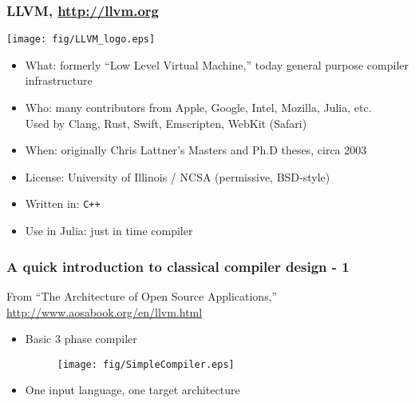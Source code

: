 \documentclass[compressed,dvips,letter]{beamer}
\begin{document}
%
%

\begin{frame}\frametitle{LLVM, \url{http://llvm.org}}
\begin{minipage}{0.35\textwidth}
\texttt{[image: fig/LLVM\_logo.eps]}
\end{minipage} \begin{minipage}{0.62\textwidth}
\begin{itemize}
\item What: formerly ``Low Level Virtual Machine,'' today general purpose compiler infrastructure
\item Who: many contributors from Apple, Google, Intel, Mozilla, Julia, etc. \\ Used by Clang, Rust, Swift, Emscripten, WebKit (Safari)
\item When: originally Chris Lattner's Masters and Ph.D theses, circa 2003
\item License: University of Illinois / NCSA (permissive, BSD-style)
\item Written in: \texttt{C++}
\item Use in Julia: just in time compiler
\end{itemize}
\end{minipage}

\end{frame}

%
%

\begin{frame}\frametitle{A quick introduction to classical compiler design - 1}
From ``The Architecture of Open Source Applications,'' \url{http://www.aosabook.org/en/llvm.html}
\begin{itemize}
\item Basic 3 phase compiler
\begin{figure}\texttt{[image: fig/SimpleCompiler.eps]}\end{figure}
\item One input language, one target architecture
\end{itemize}
\end{frame}

%
%
\end{document}
